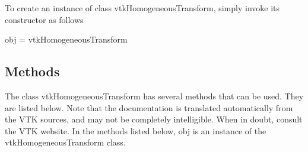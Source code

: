 To create an instance of class vtk\-Homogeneous\-Transform, simply invoke its constructor as follows \begin{DoxyVerb}  obj = vtkHomogeneousTransform
\end{DoxyVerb}
 \hypertarget{vtkwidgets_vtkxyplotwidget_Methods}{}\subsection{Methods}\label{vtkwidgets_vtkxyplotwidget_Methods}
The class vtk\-Homogeneous\-Transform has several methods that can be used. They are listed below. Note that the documentation is translated automatically from the V\-T\-K sources, and may not be completely intelligible. When in doubt, consult the V\-T\-K website. In the methods listed below, {\ttfamily obj} is an instance of the vtk\-Homogeneous\-Transform class. 
